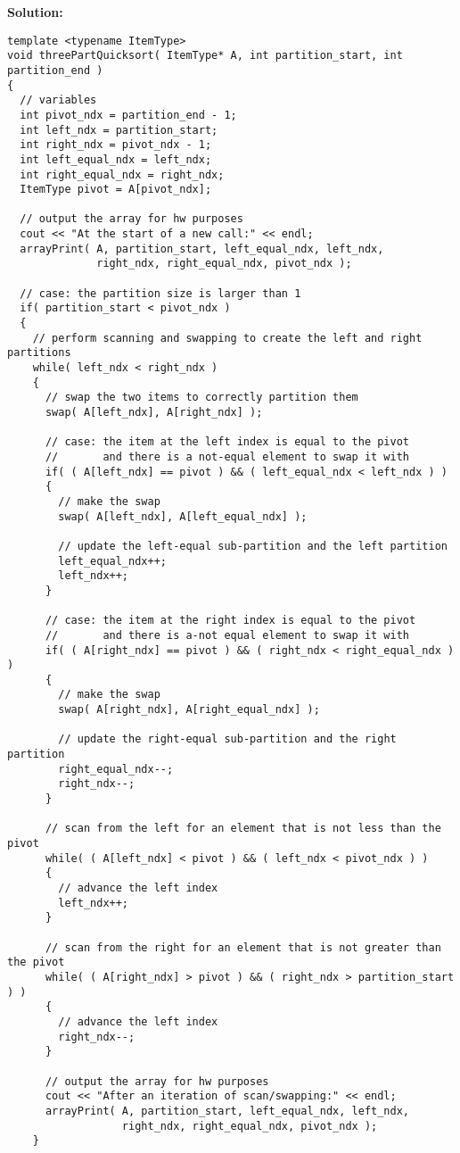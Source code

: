 \documentclass[11pts]{article}
\begin{document}
\begin{enumerate}
\begin{enumerate}
  \textbf{Solution:}
  \begin{verbatim}
template <typename ItemType>
void threePartQuicksort( ItemType* A, int partition_start, int partition_end )
{
  // variables
  int pivot_ndx = partition_end - 1;
  int left_ndx = partition_start;
  int right_ndx = pivot_ndx - 1;
  int left_equal_ndx = left_ndx;
  int right_equal_ndx = right_ndx;
  ItemType pivot = A[pivot_ndx];

  // output the array for hw purposes
  cout << "At the start of a new call:" << endl;
  arrayPrint( A, partition_start, left_equal_ndx, left_ndx,
              right_ndx, right_equal_ndx, pivot_ndx );

  // case: the partition size is larger than 1
  if( partition_start < pivot_ndx )
  {
    // perform scanning and swapping to create the left and right partitions
    while( left_ndx < right_ndx )
    {
      // swap the two items to correctly partition them
      swap( A[left_ndx], A[right_ndx] );

      // case: the item at the left index is equal to the pivot
      //       and there is a not-equal element to swap it with
      if( ( A[left_ndx] == pivot ) && ( left_equal_ndx < left_ndx ) )
      {
        // make the swap
        swap( A[left_ndx], A[left_equal_ndx] );

        // update the left-equal sub-partition and the left partition
        left_equal_ndx++;
        left_ndx++;
      }

      // case: the item at the right index is equal to the pivot
      //       and there is a-not equal element to swap it with
      if( ( A[right_ndx] == pivot ) && ( right_ndx < right_equal_ndx ) )
      {
        // make the swap
        swap( A[right_ndx], A[right_equal_ndx] );

        // update the right-equal sub-partition and the right partition
        right_equal_ndx--;
        right_ndx--;
      }

      // scan from the left for an element that is not less than the pivot
      while( ( A[left_ndx] < pivot ) && ( left_ndx < pivot_ndx ) )
      {
        // advance the left index
        left_ndx++;
      }

      // scan from the right for an element that is not greater than the pivot
      while( ( A[right_ndx] > pivot ) && ( right_ndx > partition_start ) )
      {
        // advance the left index
        right_ndx--;
      }

      // output the array for hw purposes
      cout << "After an iteration of scan/swapping:" << endl;
      arrayPrint( A, partition_start, left_equal_ndx, left_ndx,
                  right_ndx, right_equal_ndx, pivot_ndx );
    }


\end{verbatim}
\end{enumerate}
\end{enumerate}
\end{document}
